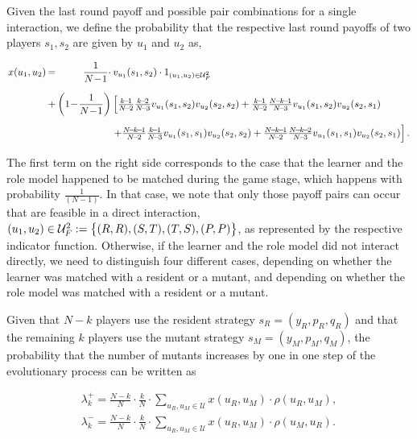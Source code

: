 \documentclass[11pt]{article}
\newcommand{\splitatcommas}[1]{%
  \begingroup
  \begingroup\lccode`~=`, \lowercase{\endgroup \edef~{\mathchar\the\mathcode`,
    \penalty0 \noexpand\hspace{0pt plus 1em}}%
  }\mathcode`,="8000 #1%
  \endgroup
}
\theoremstyle{plainCl1}
\theoremstyle{plainCl2}
\begin{document}
Given the last round payoff and possible pair combinations for a single
interaction, we define the probability that the respective last round payoffs of
two players \(s_1, s_2\) are given by $u_1$ and $u_2$ as,

\begin{equation}\label{eq:Chi}
\setlength{\arraycolsep}{1pt}
\begin{array}{llrl}
x(u_1,u_2)	 &=&\displaystyle \frac{1}{N\!-\!1}\cdot  &v_{u_1}(s_1,s_2)\cdot 1_{(u_1,u_2)\in \mathcal{U}^2_F}\\[0.5cm]
&+	
&\displaystyle \left(1\!-\!\frac{1}{N\!-\!1}\right)  
&\left[ \frac{k\!-\!1}{N\!-\!2}\frac{k\!-\!2}{N\!-\!3} v_{u_1}(s_1,s_2) v_{u_2}(s_2,s_2) + 
 \frac{k\!-\!1}{N\!-\!2}\frac{N\!-\!k\!-\!1}{N\!-\!3} v_{u_1}(s_1,s_2) v_{u_2}(s_2,s_1)\right.\\[0.5cm]
&&&\left. +\frac{N\!-\!k\!-\!1}{N\!-\!2}\frac{k\!-\!1}{N\!-\!3} v_{u_1}(s_1,s_1) v_{u_2}(s_2,s_2) + 
 \frac{N\!-\!k\!-\!1}{N\!-\!2}\frac{N\!-\!k\!-\!2}{N\!-\!3} v_{u_1}(s_1,s_1) v_{u_2}(s_2,s_1)\right].
\end{array}
\end{equation}

The first term on the right side corresponds to the case that the learner and
the role model happened to be matched during the game stage, which happens with
probability $\frac{1}{(N\!-\!1)}$. In that case, we note that only those payoff
pairs can occur that are feasible in a direct interaction,
$\splitatcommas{(u_1,u_2)\in \mathcal{U}^2_F:=\big\{ (R,R), (S,T), (T,S), (P,P)
\big\}}$, as represented by the respective indicator function. Otherwise, if the
learner and the role model did not interact directly, we need to distinguish
four different cases, depending on whether the learner was matched with a
resident or a mutant, and depending on whether the role model was matched with a
resident or a mutant.

Given that $N\!-\!k$ players use the resident strategy
$s_{R}\!=\!(y_{R},p_{R},q_{R})$ and that the remaining $k$ players use the
mutant strategy $s_{M}\!=\!(y_{M},p_{M},q_{M})$, the probability that the number
of mutants increases by one in one step of the evolutionary process can be
written as

\begin{align}
\lambda^+_k=\frac{N\!-\!k}{N}\cdot \frac{k}{N}\cdot \sum_{u_{R},u_{M}\in\mathcal{U}} x(u_{R},u_{M})\cdot \rho(u_{R},u_{M}), \\
\lambda^-_k=\frac{N\!-\!k}{N}\cdot \frac{k}{N}\cdot \sum_{u_{R},u_{M}\in\mathcal{U}} x(u_{R},u_{M})\cdot \rho(u_{M},u_{R}).
\end{align}
\end{document}
